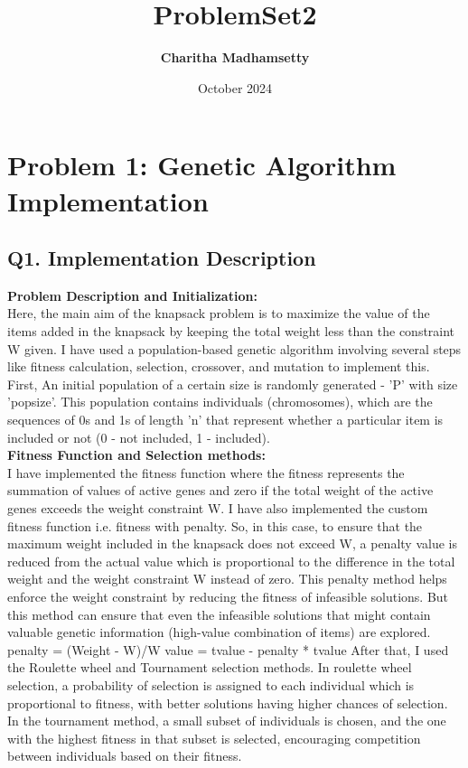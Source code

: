 \documentclass{article}
\title{\textbf{ProblemSet2}}
\author{\textbf{Charitha Madhamsetty}}
\date{October 2024}
\begin{document}
\maketitle
\section*{Problem 1: Genetic Algorithm Implementation}
\subsection*{\textbf{Q1. Implementation Description}}
\textbf{Problem Description and Initialization:}\\
Here, the main aim of the knapsack problem is to maximize the value of the items added in the knapsack by keeping the total weight less than the constraint W given. I have used a population-based genetic algorithm involving several steps like fitness calculation, selection, crossover, and mutation to implement this. First, An initial population of a certain size is randomly generated - 'P' with size 'popsize'. This population contains individuals (chromosomes), which are the sequences of 0s and 1s of length 'n' that represent whether a particular item is included or not (0 - not included, 1 - included).\\
\textbf{Fitness Function and Selection methods:}\\
I have implemented the fitness function where the fitness represents the summation of values of active genes and zero if the total weight of the active genes exceeds the weight constraint W. I have also implemented the custom fitness function i.e. fitness with penalty. So, in this case, to ensure that the maximum weight included in the knapsack does not exceed W, a penalty value is reduced from the actual value which is proportional to the difference in the total weight and the weight constraint W instead of zero. This penalty method helps enforce the weight constraint by reducing the fitness of infeasible solutions. But this method can ensure that even the infeasible solutions that might contain valuable genetic information (high-value combination of items) are explored.
penalty = (Weight - W)/W
value = tvalue - penalty * tvalue
After that, I used the Roulette wheel and Tournament selection methods. In roulette wheel selection, a probability of selection is assigned to each individual which is proportional to fitness, with better solutions having higher chances of selection. In the tournament method, a small subset of individuals is chosen, and the one with the highest fitness in that subset is selected, encouraging competition between individuals based on their fitness.
\end{document}
